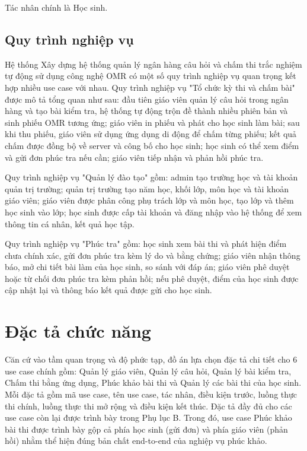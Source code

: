 ﻿\documentclass[../DoAn.tex]{subfiles}
\begin{document}
Tác nhân chính là Học sinh.

\subsection{Quy trình nghiệp vụ}
\label{subsection:2.2.13}

Hệ thống Xây dựng hệ thống quản lý ngân hàng câu hỏi và chấm thi trắc nghiệm tự động sử dụng công nghệ OMR có một số quy trình nghiệp vụ quan trọng kết hợp nhiều use case với nhau. Quy trình nghiệp vụ "Tổ chức kỳ thi và chấm bài" được mô tả tổng quan như sau: đầu tiên giáo viên quản lý câu hỏi trong ngân hàng và tạo bài kiểm tra, hệ thống tự động trộn đề thành nhiều phiên bản và sinh phiếu OMR tương ứng; giáo viên in phiếu và phát cho học sinh làm bài; sau khi thu phiếu, giáo viên sử dụng ứng dụng di động để chấm từng phiếu; kết quả chấm được đồng bộ về server và công bố cho học sinh; học sinh có thể xem điểm và gửi đơn phúc tra nếu cần; giáo viên tiếp nhận và phản hồi phúc tra.

Quy trình nghiệp vụ "Quản lý đào tạo" gồm: admin tạo trường học và tài khoản quản trị trường; quản trị trường tạo năm học, khối lớp, môn học và tài khoản giáo viên; giáo viên được phân công phụ trách lớp và môn học, tạo lớp và thêm học sinh vào lớp; học sinh được cấp tài khoản và đăng nhập vào hệ thống để xem thông tin cá nhân, kết quả học tập.

Quy trình nghiệp vụ "Phúc tra" gồm: học sinh xem bài thi và phát hiện điểm chưa chính xác, gửi đơn phúc tra kèm lý do và bằng chứng; giáo viên nhận thông báo, mở chi tiết bài làm của học sinh, so sánh với đáp án; giáo viên phê duyệt hoặc từ chối đơn phúc tra kèm phản hồi; nếu phê duyệt, điểm của học sinh được cập nhật lại và thông báo kết quả được gửi cho học sinh.

\section{Đặc tả chức năng}
\label{section:2.3}

Căn cứ vào tầm quan trọng và độ phức tạp, đồ án lựa chọn đặc tả chi tiết cho 6 use case chính gồm: Quản lý giáo viên, Quản lý câu hỏi, Quản lý bài kiểm tra, Chấm thi bằng ứng dụng, Phúc khảo bài thi và Quản lý các bài thi của học sinh. Mỗi đặc tả gồm mã use case, tên use case, tác nhân, điều kiện trước, luồng thực thi chính, luồng thực thi mở rộng và điều kiện kết thúc. Đặc tả đầy đủ cho các use case còn lại được trình bày trong Phụ lục B. Trong đó, use case Phúc khảo bài thi được trình bày gộp cả phía học sinh (gửi đơn) và phía giáo viên (phản hồi) nhằm thể hiện đúng bản chất end-to-end của nghiệp vụ phúc khảo.
\end{document}
